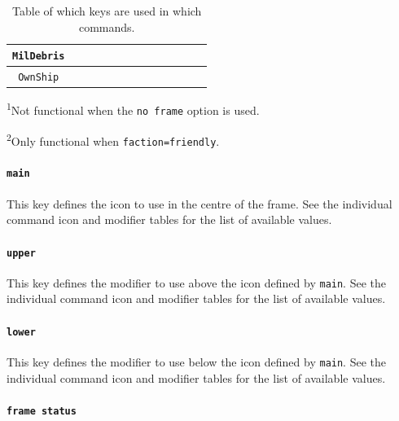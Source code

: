 \documentclass[a4paper, titlepage]{article}
\begin{document}
\begin{table}[H]
\begin{tabular}{|c|c|c|c|c|c|c|c|c|c|c|c|c|}
\texttt{MilDebris} & \cellcolor{black} & \cellcolor{black} & \cellcolor{black} & \cellcolor{black} & \cellcolor{black} & \cellcolor{black} & &  \cellcolor{black} & \cellcolor{black} & \cellcolor{black} & \cellcolor{black} & \cellcolor{black}\\ \hline
\texttt{OwnShip} & \cellcolor{black} & \cellcolor{black} & \cellcolor{black} & \cellcolor{black} & \cellcolor{black} & \cellcolor{black} & &  \cellcolor{black} & \cellcolor{black} & \cellcolor{black} & \cellcolor{black} & \cellcolor{black}\\ \hline
\end{tabular}
\begin{tablenotes}
\item \textsuperscript{1}Not functional when the \texttt{no frame} option is used.
\item \textsuperscript{2}Only functional when \texttt{faction=friendly}.
\end{tablenotes}
\caption{Table of which keys are used in which commands.}
\label{shared}
\end{table}

\paragraph{\texttt{main}}

This key defines the icon to use in the centre of the frame. See the individual command icon and modifier tables for the list of available values.

\paragraph{\texttt{upper}} 

This key defines the modifier to use above the icon defined by \texttt{main}. See the individual command icon and modifier tables for the list of available values.

\paragraph{\texttt{lower}} 

This key defines the modifier to use below the icon defined by \texttt{main}. See the individual command icon and modifier tables for the list of available values.

\paragraph{\texttt{frame status}}
\end{document}
